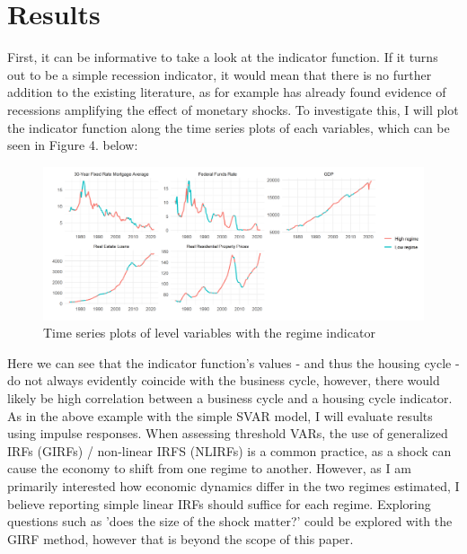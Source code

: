 \documentclass[12pt,a4paper]{article}
\begin{document}
\section{Results}
First, it can be informative to take a look at the indicator function. If it turns out to be a simple recession indicator, it would mean that there is no further addition to the existing literature, as for example \textcolor{blue}{\cite{jan1998}} has already found evidence of recessions amplifying the effect of monetary shocks. To investigate this, I will plot the indicator function along the time series plots of each variables, which can be seen in Figure 4. below:
\begin{center}
	\begin{figure}[h!]
		\includegraphics[width = \textwidth]{indicator.png}
		\caption{Time series plots of level variables with the regime indicator}
	\end{figure}
\end{center}
\noindent Here we can see that the indicator function's values - and thus the housing cycle -  do not always evidently coincide with the business cycle, however, there would likely be high correlation between a business cycle and a housing cycle indicator.\\

As in the above example with the simple SVAR model, I will evaluate results using impulse responses. When assessing threshold VARs, the use of generalized IRFs (GIRFs) / non-linear IRFS (NLIRFs) is a common practice, as a shock can cause the economy to shift from one regime to another. However, as I am primarily interested how economic dynamics differ in the two regimes estimated, I believe reporting simple linear IRFs should suffice for each regime. Exploring questions such as 'does the size of the shock matter?' could be explored with the GIRF method, however that is beyond the scope of this paper.\\
\end{document}
